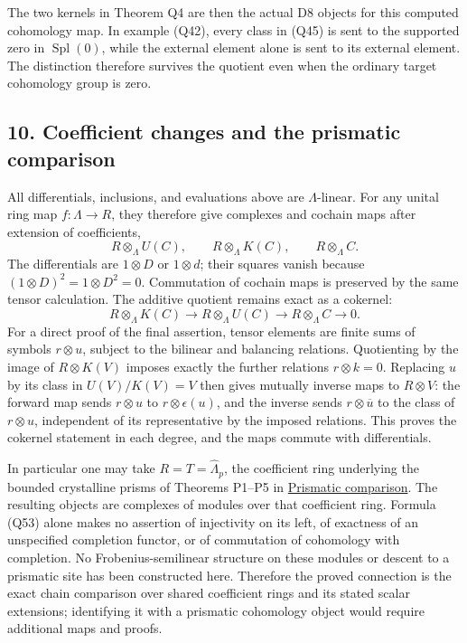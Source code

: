 \documentclass[
]{article}
\begin{document}
The two kernels in Theorem Q4 are then the actual D8 objects for this
computed cohomology map. In example (Q42), every class in (Q45) is sent
to the supported zero in \(\operatorname{Spl}(0)\), while the external
element alone is sent to its external element. The distinction therefore
survives the quotient even when the ordinary target cohomology group is
zero.

\subsection{10. Coefficient changes and the prismatic
comparison}\label{coefficient-changes-and-the-prismatic-comparison}

All differentials, inclusions, and evaluations above are
\(\Lambda\)-linear. For any unital ring map \(f:\Lambda\to R\), they
therefore give complexes and cochain maps after extension of
coefficients, \[
R\otimes_\Lambda U(C),\qquad
R\otimes_\Lambda K(C),\qquad
R\otimes_\Lambda C.
\tag{Q52}
\] The differentials are \(1\otimes D\) or \(1\otimes d\); their squares
vanish because \((1\otimes D)^2=1\otimes D^2=0\). Commutation of cochain
maps is preserved by the same tensor calculation. The additive quotient
remains exact as a cokernel: \[
R\otimes_\Lambda K(C)\longrightarrow
R\otimes_\Lambda U(C)\longrightarrow
R\otimes_\Lambda C\longrightarrow0.
\tag{Q53}
\] For a direct proof of the final assertion, tensor elements are finite
sums of symbols \(r\otimes u\), subject to the bilinear and balancing
relations. Quotienting by the image of \(R\otimes K(V)\) imposes exactly
the further relations \(r\otimes k=0\). Replacing \(u\) by its class in
\(U(V)/K(V)=V\) then gives mutually inverse maps to \(R\otimes V\): the
forward map sends \(r\otimes u\) to \(r\otimes\epsilon(u)\), and the
inverse sends \(r\otimes\overline u\) to the class of \(r\otimes u\),
independent of its representative by the imposed relations. This proves
the cokernel statement in each degree, and the maps commute with
differentials.

In particular one may take \(R=T=\widehat\Lambda_p\), the coefficient
ring underlying the bounded crystalline prisms of Theorems P1--P5 in
\href{https://github.com/KokunoYumeto/zeta-function-research-reader/blob/6af54ea3c8ef99127af327f3103e086c68d482c2/workbenches/splitzero-tandem/branches/identity-absorber-square/PRISMATIC_COMPARISON.md}{Prismatic
comparison}. The resulting objects are complexes of modules over that
coefficient ring. Formula (Q53) alone makes no assertion of injectivity
on its left, of exactness of an unspecified completion functor, or of
commutation of cohomology with completion. No Frobenius-semilinear
structure on these modules or descent to a prismatic site has been
constructed here. Therefore the proved connection is the exact chain
comparison over shared coefficient rings and its stated scalar
extensions; identifying it with a prismatic cohomology object would
require additional maps and proofs.
\end{document}
